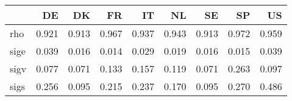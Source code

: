 \begin{tabular}{lrrrrrrrr}
\toprule
{} &     DE &     DK &     FR &     IT &     NL &     SE &     SP &     US \\
\midrule
rho  &  0.921 &  0.913 &  0.967 &  0.937 &  0.943 &  0.913 &  0.972 &  0.959 \\
sige &  0.039 &  0.016 &  0.014 &  0.029 &  0.019 &  0.016 &  0.015 &  0.039 \\
sigv &  0.077 &  0.071 &  0.133 &  0.157 &  0.119 &  0.071 &  0.263 &  0.097 \\
sigs &  0.256 &  0.095 &  0.215 &  0.237 &  0.170 &  0.095 &  0.270 &  0.486 \\
\bottomrule
\end{tabular}
